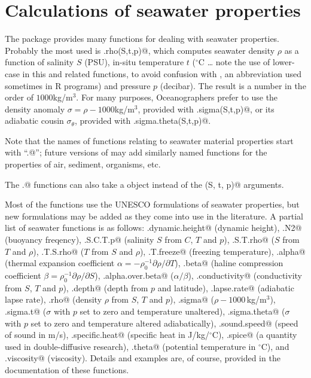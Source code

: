 \documentclass{article}
\begin{document}
\section{Calculations of seawater properties}


The \verb@oce@ package provides many functions for dealing with seawater
properties. Probably the most used is \verb@sw.rho(S,t,p)@, which computes
seawater density $\rho$ as a function of salinity $S$ (PSU), in-situ temperature
$t$ ($^\circ$C \dots\/ note the use of lower-case in this and related functions,
to avoid confusion with \verb@T@, an abbreviation used sometimes in R programs)
and pressure $p$ (decibar). The result is a number in the order of
$1000$kg/m$^3$.  For many purposes, Oceanographers prefer to use the density
anomaly $\sigma=\rho-1000$kg/m$^3$, provided with \verb@sw.sigma(S,t,p)@, or its
adiabatic cousin $\sigma_\theta$, provided with \verb@sw.sigma.theta(S,t,p)@.

Note that the names of functions relating to seawater material properties start
with ``\verb@sw.@''; future versions of \verb@oce@ may add similarly named
functions for the properties of air, sediment, organisms, etc.

The \verb@sw.@ functions can also take a \verb@ctd@ object instead of the
\verb@(S, t, p)@ arguments.

Most of the functions use the UNESCO formulations of seawater properties, but new formulations
may be added as they come into use in the literature.
A partial list of seawater functions is as follows:
\verb@sw.dynamic.height@ (dynamic height),
\verb@sw.N2@ (buoyancy freqency),
\verb@sw.S.C.T.p@ (salinity $S$ from $C$, $T$ and $p$),
\verb@sw.S.T.rho@ ($S$ from $T$ and $\rho$),
\verb@sw.T.S.rho@ ($T$ from $S$ and $\rho$),
\verb@sw.T.freeze@ (freezing temperature),
\verb@sw.alpha@ (thermal expansion coefficient $\alpha=-\rho_0^{-1}\partial\rho/\partial T$),
\verb@sw.beta@ (haline compression coefficient $\beta=\rho_0^{-1}\partial\rho/\partial S$),
\verb@sw.alpha.over.beta@ ($\alpha/\beta$),
\verb@sw.conductivity@ (conductivity from $S$, $T$ and $p$),
\verb@sw.depth@ (depth from $p$ and latitude),
\verb@sw.lapse.rate@ (adiabatic lapse rate),
\verb@sw.rho@ (density $\rho$ from $S$, $T$ and $p$),
\verb@sw.sigma@ ($\rho-1000$\,kg/m$^3$),
\verb@sw.sigma.t@ ($\sigma$ with $p$ set to zero and temperature unaltered),
\verb@sw.sigma.theta@ ($\sigma$ with $p$ set to zero and temperature altered adiabatically),
\verb@sw.sound.speed@ (speed of sound in m/s),
\verb@sw.specific.heat@ (specific heat in J/kg/$^\circ$C),
\verb@sw.spice@ (a quantity used in double-diffusive research),
\verb@sw.theta@ (potential temperature in $^\circ$C),
and
\verb@sw.viscosity@ (viscosity).
Details and examples are, of course, provided in the documentation of these functions.
\end{document}
